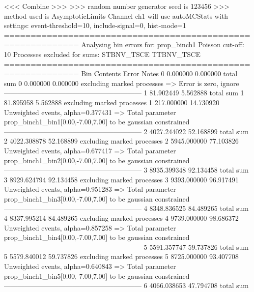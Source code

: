  <<< Combine >>> 
>>> random number generator seed is 123456
>>> method used is AsymptoticLimits
Channel ch1 will use autoMCStats with settings: event-threshold=10, include-signal=0, hist-mode=1
============================================================
Analysing bin errors for: prop_binch1
Poisson cut-off: 10
Processes excluded for sums: STBNV_TSCE TTBNV_TSCE
============================================================
Bin        Contents        Error           Notes                         
0          0.000000        0.000000        total sum                     
0          0.000000        0.000000        excluding marked processes    
  => Error is zero, ignore      
------------------------------------------------------------
1          81.902449       5.562888        total sum                     
1          81.895958       5.562888        excluding marked processes    
1          217.000000      14.730920       Unweighted events, alpha=0.377431
  => Total parameter prop_binch1_bin1[0.00,-7.00,7.00] to be gaussian constrained
------------------------------------------------------------
2          4027.244022     52.168899       total sum                     
2          4022.308878     52.168899       excluding marked processes    
2          5945.000000     77.103826       Unweighted events, alpha=0.677417
  => Total parameter prop_binch1_bin2[0.00,-7.00,7.00] to be gaussian constrained
------------------------------------------------------------
3          8935.399348     92.134458       total sum                     
3          8929.624794     92.134458       excluding marked processes    
3          9393.000000     96.917491       Unweighted events, alpha=0.951283
  => Total parameter prop_binch1_bin3[0.00,-7.00,7.00] to be gaussian constrained
------------------------------------------------------------
4          8348.836525     84.489265       total sum                     
4          8337.995214     84.489265       excluding marked processes    
4          9739.000000     98.686372       Unweighted events, alpha=0.857258
  => Total parameter prop_binch1_bin4[0.00,-7.00,7.00] to be gaussian constrained
------------------------------------------------------------
5          5591.357747     59.737826       total sum                     
5          5579.840012     59.737826       excluding marked processes    
5          8725.000000     93.407708       Unweighted events, alpha=0.640843
  => Total parameter prop_binch1_bin5[0.00,-7.00,7.00] to be gaussian constrained
------------------------------------------------------------
6          4066.038653     47.794708       total sum                     
